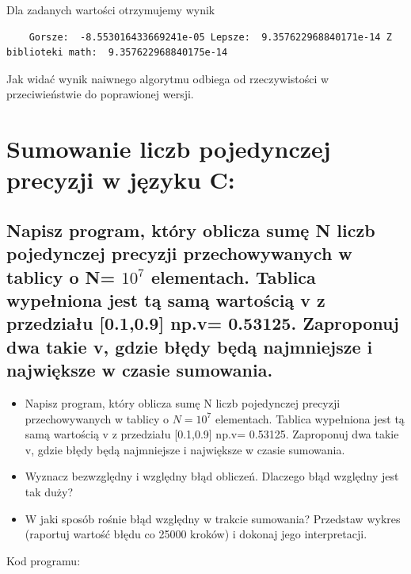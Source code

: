 Dla zadanych wartości otrzymujemy wynik
\begin{lstlisting}
	Gorsze:  -8.553016433669241e-05 Lepsze:  9.357622968840171e-14 Z biblioteki math:  9.357622968840175e-14
\end{lstlisting}
Jak widać wynik naiwnego algorytmu odbiega od rzeczywistości w przeciwieństwie do poprawionej wersji.

\section{Sumowanie liczb pojedynczej precyzji w języku C:
}
\subsection{Napisz program, który oblicza sumę N liczb pojedynczej precyzji przechowywanych w tablicy o N= $10^7$ elementach. Tablica wypełniona jest tą samą wartością v z przedziału [0.1,0.9] np.v= 0.53125. Zaproponuj dwa takie v, gdzie błędy będą najmniejsze i największe w czasie sumowania.}

\begin{itemize}
	\item Napisz program, który oblicza sumę N liczb pojedynczej precyzji przechowywanych w tablicy o $N= 10^7$ elementach. Tablica wypełniona jest tą samą wartością v z przedziału [0.1,0.9] np.v= 0.53125. Zaproponuj dwa takie v, gdzie błędy będą najmniejsze i największe w czasie sumowania.
	\item Wyznacz bezwzględny i względny błąd obliczeń. Dlaczego błąd względny jest tak duży?
	\item W jaki sposób rośnie błąd względny w trakcie sumowania? Przedstaw wykres (raportuj wartość błędu co 25000 kroków) i dokonaj jego interpretacji.

\end{itemize}

Kod programu:

